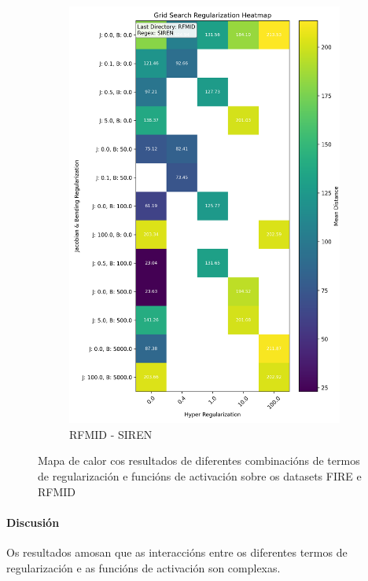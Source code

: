 \begin{figure}[ht]
\begin{subfigure}[b]{0.4\textwidth}
        \includegraphics[width=\textwidth]{imaxes/grid_search_single_heatmap_RFMID_SIREN.png}
        \caption{RFMID - SIREN}
        \label{fig:gs_single_RFMID_SIREN}
    \end{subfigure}
    
    \caption{Mapa de calor cos resultados de diferentes combinacións de termos de regularización e funcións de activación sobre os datasets FIRE e RFMID}
    \label{fig:gs_single_heatmaps}
\end{figure}

\paragraph{Discusión}
\label{par:Discusion-reg2}

Os resultados amosan que as interaccións entre os diferentes termos de regularización e as funcións de activación son complexas.

\FloatBarrier